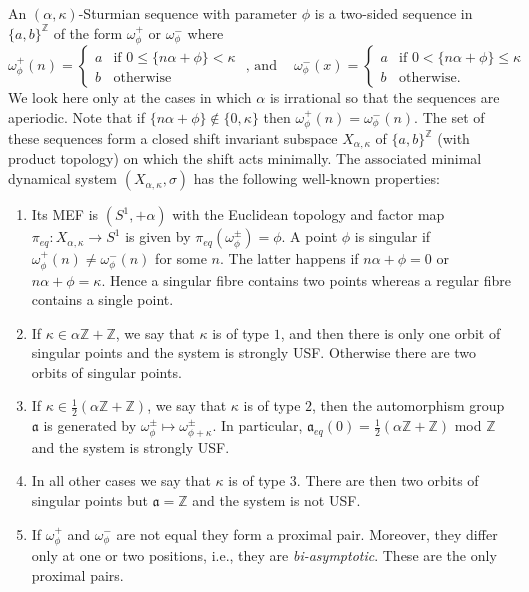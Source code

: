 \documentclass[12pt]{amsart}
\theoremstyle{definition}
\numberwithin{equation}{section}
\newcommand{\Z}{\mathbb Z}
\newcommand{\aut}{{\mathfrak a}}
\newcommand{\aute}{\aut_{eq}}
\newcommand{\pe}{\pi_{eq}}
\newcommand{\al}{\alpha}
\newcommand{\cut}{\kappa}
\begin{document}
An $(\al,\cut)$-Sturmian sequence with parameter $\phi$ is a two-sided sequence in $\{a,b\}^\Z$ of the form $\omega_\phi^+$ or $\omega_\phi^-$ where 
$$\omega_\phi^+(n) = \left\{\begin{array}{ll}
\!\!	a & \!\! \mbox{if } 0 \leq \{n\al +\phi\} < \cut \\
\!\!	b &\!\! \mbox{otherwise} \end{array}
\right.\!\!\!\!\!\! \mbox{ , and }\:\:\:\:
\omega_\phi^-(x) = \left\{\begin{array}{ll}
\!\!	a & \!\!\mbox{if } 0 < \{n\al +\phi\} \leq \cut \\
\!\!	b &\!\! \mbox{otherwise.} \end{array}
\right.$$
We look here only at the cases in which $\alpha$ is irrational so that the sequences are aperiodic. Note that if $\{n\al+\phi\}\notin \{0,\kappa\}$ then 
$\omega_\phi^+(n) = \omega_\phi^-(n)$. The set of these sequences form a closed shift invariant subspace $X_{\al,\cut}$ of $\{a,b\}^\Z$ (with product topology) on which the shift acts minimally. The associated minimal dynamical system $(X_{\al,\cut},\sigma)$ has the following well-known properties:
\begin{enumerate}
\item Its MEF is $(S^1,+\al)$ with the Euclidean topology and factor map $\pe:X_{\al,\cut}\to S^1$ is given by $\pe(\omega_\phi^\pm) = \phi$. 
A point $\phi$ is singular if $\omega_\phi^+(n) \neq \omega_\phi^-(n)$ for some $n$. The latter happens if $n\al+\phi = 0$ or $n\al+\phi =\kappa$. 
Hence a singular fibre contains two points whereas a regular fibre contains a single point.
\item If $\cut \in \al\Z+\Z$, we say that $\kappa$ is of type $1$, and then there is only one orbit of singular points and the system is strongly USF. Otherwise there are two orbits of singular points.
\item If $\cut \in \frac12(\al\Z+\Z)$, we say that $\kappa$ is of type $2$, then the automorphism group $\aut$ is generated by $\omega_\phi^\pm \mapsto \omega_{\phi+\cut}^\pm$. In particular, 
$\aute(0) = \frac12(\al\Z+\Z)$ mod $\Z$ and the system is strongly USF.  
\item In all other cases we say that $\kappa$ is of type $3$. There are then two orbits of singular points but $\aut = \Z$ and the system is not USF. 
\item If $\omega_\phi^+$ and  $\omega_\phi^-$ are not equal they form a proximal pair. 
Moreover, they differ only at one or two positions, i.e., they are {\em bi-asymptotic}. These are the only proximal pairs.
\end{enumerate}
\end{document}
